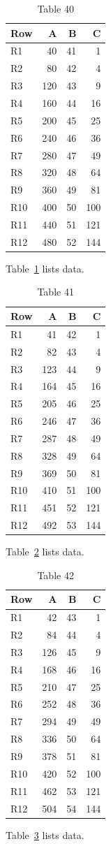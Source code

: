 \documentclass[10pt]{article}
\begin{document}
\begin{table}[ht]\centering\caption{Table 40}\label{tab:40}\begin{tabular}{lrrr}\toprule Row&A&B&C\\\midrule
R1&40&41&1\\
R2&80&42&4\\
R3&120&43&9\\
R4&160&44&16\\
R5&200&45&25\\
R6&240&46&36\\
R7&280&47&49\\
R8&320&48&64\\
R9&360&49&81\\
R10&400&50&100\\
R11&440&51&121\\
R12&480&52&144\\
\bottomrule\end{tabular}\end{table} Table~\ref{tab:40} lists data.
\begin{table}[ht]\centering\caption{Table 41}\label{tab:41}\begin{tabular}{lrrr}\toprule Row&A&B&C\\\midrule
R1&41&42&1\\
R2&82&43&4\\
R3&123&44&9\\
R4&164&45&16\\
R5&205&46&25\\
R6&246&47&36\\
R7&287&48&49\\
R8&328&49&64\\
R9&369&50&81\\
R10&410&51&100\\
R11&451&52&121\\
R12&492&53&144\\
\bottomrule\end{tabular}\end{table} Table~\ref{tab:41} lists data.
\begin{table}[ht]\centering\caption{Table 42}\label{tab:42}\begin{tabular}{lrrr}\toprule Row&A&B&C\\\midrule
R1&42&43&1\\
R2&84&44&4\\
R3&126&45&9\\
R4&168&46&16\\
R5&210&47&25\\
R6&252&48&36\\
R7&294&49&49\\
R8&336&50&64\\
R9&378&51&81\\
R10&420&52&100\\
R11&462&53&121\\
R12&504&54&144\\
\bottomrule\end{tabular}\end{table}\clearpage Table~\ref{tab:42} lists data.
\end{document}
